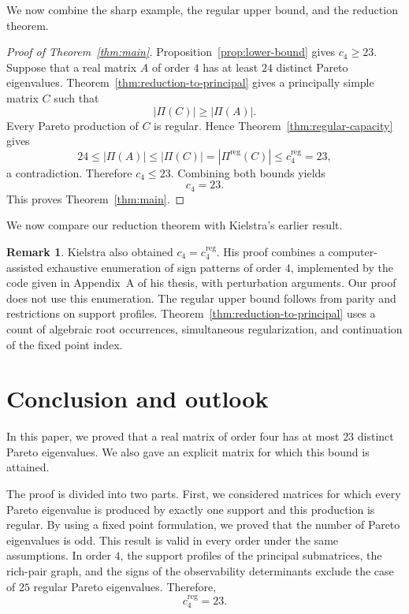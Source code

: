 \documentclass[11pt,a4paper]{article}
\theoremstyle{definition}
\newtheorem{remark}[theorem]{Remark}
\begin{document}
We now combine the sharp example, the regular upper bound, and the
reduction theorem.

\begin{proof}[Proof of Theorem~\ref{thm:main}]
Proposition~\ref{prop:lower-bound} gives $c_4\geq23$. Suppose that a
real matrix $A$ of order $4$  has at least $24$ distinct Pareto
eigenvalues. Theorem~\ref{thm:reduction-to-principal} gives a
principally simple matrix $C$ such that
$$
|\Pi(C)|\geq|\Pi(A)|.
$$
Every Pareto production of $C$ is regular. Hence
Theorem~\ref{thm:regular-capacity} gives
$$
24
\leq
|\Pi(A)|
\leq
|\Pi(C)|
=
|\Pi^{\mathrm{reg}}(C)|
\leq
c_4^{\mathrm{reg}}
=23,
$$
a contradiction. Therefore $c_4\leq23$. Combining both bounds yields
$$
c_4=23.
$$
This proves Theorem~\ref{thm:main}.
\end{proof}

We now compare our reduction theorem with Kielstra's earlier result.
\begin{remark}
Kielstra \cite[Corollary~6.1.7]{Kielstra2023} also obtained
$c_4=c_4^{\mathrm{reg}}$. His proof combines a computer-assisted
exhaustive enumeration of sign patterns of order $4$,
implemented by the code given in Appendix~A of his thesis, with
perturbation arguments. Our proof does not use this enumeration. The
regular upper bound follows from parity and restrictions on support
profiles. Theorem~\ref{thm:reduction-to-principal} uses a count of
algebraic root occurrences, simultaneous regularization, and
continuation of the fixed point index.
\end{remark}

\section{Conclusion and outlook}
\label{sec:conclusion}
In this paper, we proved that a real matrix of order four has at most $23$ distinct Pareto eigenvalues. We also gave an explicit matrix for which this bound is attained.

The proof is divided into two parts. First, we considered matrices for which every Pareto eigenvalue is produced by exactly one support and this production is regular. By using a fixed point formulation, we proved that the number of Pareto eigenvalues is odd. This result is valid in every order under the same assumptions. In order $4$, the support profiles of the principal submatrices, the rich-pair graph, and the signs of the observability determinants exclude the case of $25$ regular Pareto eigenvalues. Therefore,
$$
c_4^{\mathrm{reg}}=23.
$$
\end{document}
